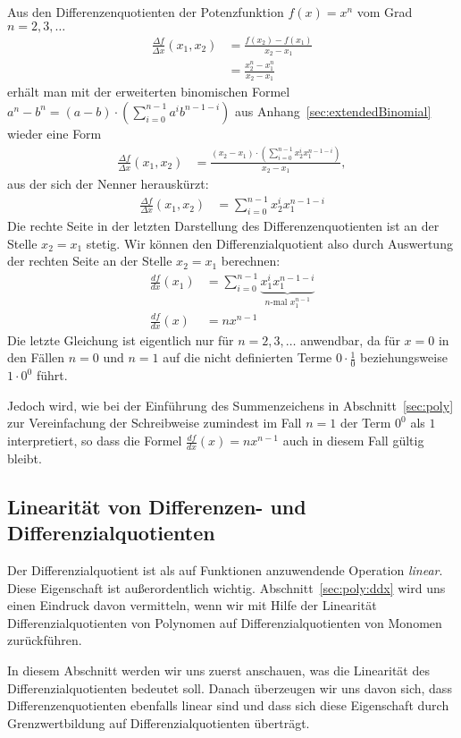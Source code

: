 \documentclass{article}
\let\l\left\let\r\right\let\cs\csname\let\ecs\endcsname\let\ea\expandafter
\def\ddx#1{\frac{d#1}{dx}}
\def\DDx#1{\frac{\Delta#1}{\Delta x}}
\begin{document}
Aus den Differenzenquotienten der Potenzfunktion $f(x)=x^n$ vom Grad $n=2,3,\ldots$
\begin{align*}
  \frac{\Delta f}{\Delta x}(x_1,x_2) &= \frac{f(x_2) - f(x_1)}{x_2-x_1}\\
                                     &= \frac{x_2^n - x_1^n}{x_2-x_1}
\end{align*}
erhält man mit der erweiterten binomischen Formel
$a^n-b^n=(a-b)\cdot\l(\sum_{i=0}^{n-1}a^ib^{n-1-i}\r)$ aus
Anhang~\ref{sec:extendedBinomial} wieder eine Form
\begin{align*}
  \DDx f(x_1,x_2)&= \frac{(x_2-x_1)\cdot\l(\sum_{i=0}^{n-1} x_2^ix_1^{n-1-i}\r)}{x_2-x_1},
\end{align*}
aus der sich der Nenner herauskürzt:
\begin{align*}
  \DDx f(x_1,x_2)&= \sum_{i=0}^{n-1} x_2^ix_1^{n-1-i}
\end{align*}
Die rechte Seite in der letzten Darstellung des Differenzenquotienten
ist an der Stelle $x_2=x_1$ stetig.  Wir können den
Differenzialquotient also durch Auswertung der rechten Seite an der
Stelle $x_2=x_1$ berechnen:
\begin{align}
  \ddx f(x_1) &= \sum_{i=0}^{n-1} \underbrace{x_1^i x_1^{n-1-i}}_{\text{$n$-mal $x_1^{n-1}$}} \\
  \ddx f(x) &= n x^{n-1}\label{eq:diff:monom}
\end{align}
Die letzte Gleichung ist eigentlich nur für $n=2,3,\ldots$ anwendbar,
da für $x=0$ in den Fällen $n=0$ und $n=1$ auf die nicht definierten
Terme $0\cdot\frac{1}{0}$ beziehungsweise $1\cdot 0^0$ führt.

Jedoch wird, wie bei der Einführung des Summenzeichens in
Abschnitt~\ref{sec:poly} zur Vereinfachung der Schreibweise zumindest
im Fall $n=1$ der Term $0^0$ als $1$ interpretiert, so dass die Formel
$\ddx f(x) = n x^{n-1}$ auch in diesem Fall gültig bleibt.
\subsection{Linearität von Differenzen- und Differenzialquotienten}
\label{sec:ddx:linearity}
Der Differenzialquotient ist als auf Funktionen anzuwendende Operation
\emph{linear}.  Diese Eigenschaft ist außerordentlich
wichtig. Abschnitt~\ref{sec:poly:ddx} wird uns einen Eindruck davon
vermitteln, wenn wir mit Hilfe der Linearität Differenzialquotienten
von Polynomen auf Differenzialquotienten von Monomen zurückführen.

In diesem Abschnitt werden wir uns zuerst anschauen, was die
Linearität des Differenzialquotienten bedeutet soll. Danach überzeugen
wir uns davon sich, dass Differenzenquotienten ebenfalls linear sind
und dass sich diese Eigenschaft durch Grenzwertbildung auf
Differenzialquotienten überträgt.
\end{document}
